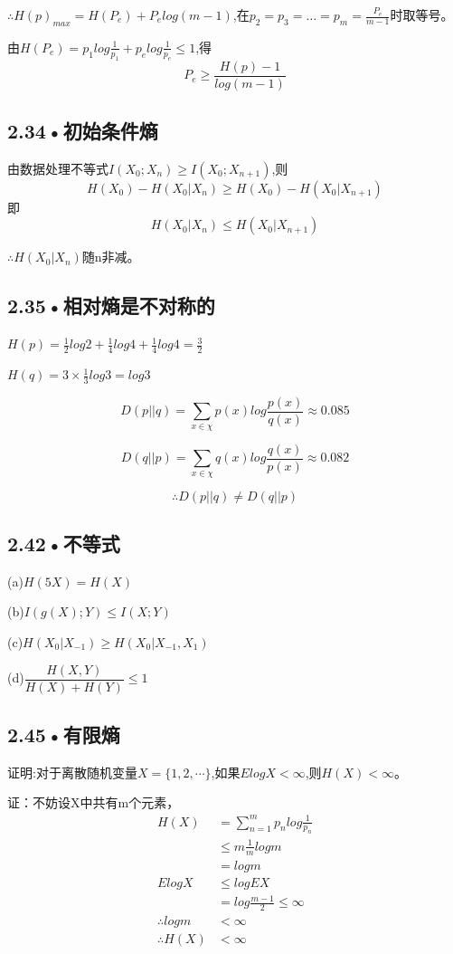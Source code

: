 \documentclass[UTF8]{ctexart}
\begin{document}
$\therefore H(p)_{max}=H(P_e)+ P_elog(m-1)$,在$p_2=p_3=\dots=p_m=\frac{P_e}{m-1}$时取等号。

由$H(P_e)= p_1log\frac{1}{p_1}+p_elog\frac{1}{p_e}\leqslant 1$,得$$P_e\geqslant \dfrac{H(p)-1}{log(m-1)}$$


\subsection*{2.34•初始条件熵}

由数据处理不等式$I(X_0;X_n)\geqslant I(X_0;X_{n+1})$,则$$H(X_0)-H(X_0|X_n)\geqslant H(X_0)-H(X_0|X_{n+1})$$即$$H(X_0|X_n)\leqslant H(X_0|X_{n+1}) $$

$\therefore H(X_0|X_n)$随n非减。


\subsection*{2.35•相对熵是不对称的}

$H(p)=\frac{1}{2}log2+\frac{1}{4}log4+\frac{1}{4}log4=\frac{3}{2}$

$H(q)=3\times\frac{1}{3}log3=log3$

$$D(p||q)=\sum _{x\in\chi}p(x)log\dfrac{p(x)}{q(x)}\approx 0.085$$

$$D(q||p)=\sum _{x\in\chi}q(x)log\dfrac{q(x)}{p(x)}\approx 0.082$$

$$\therefore D(p||q)\neq D(q||p) $$

\subsection*{2.42•不等式}

(a)$H(5X)=H(X)$

(b)$I(g(X);Y)\leqslant I(X;Y) $

(c)$H(X_0|X_{-1})\geqslant H(X_0|X_{-1},X_1) $

(d)$\dfrac{H(X,Y)}{H(X)+H(Y)} \leqslant 1$

\subsection*{2.45•有限熵}

证明:对于离散随机变量$X=\{1,2,\cdots\}$,如果$ElogX<\infty$,则$H(X)<\infty$。

证：不妨设X中共有m个元素，
\begin{equation*}
\begin{split}
H(X)&=\sum_{n=1}^m p_nlog\frac{1}{p_n}\\
&\leqslant m\frac{1}{m}logm\\
&=logm\\
ElogX&\leqslant logEX\\
&=log\frac{m-1}{2}\leqslant \infty\\
\therefore logm&<\infty\\
\therefore H(X)&<\infty
\end{split}
\end{equation*}
\end{document}
